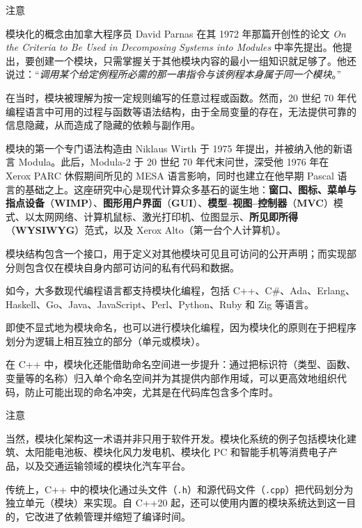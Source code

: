\begin{myNotic}{注意}

模块化的概念由加拿大程序员 David Parnas 在其 1972 年那篇开创性的论文 \emph{On the Criteria to Be Used in Decomposing Systems into Modules} 中率先提出。他提出，要创建一个模块，只需掌握关于其他模块内容的最小一组知识就足够了。他还说过：“\emph{调用某个给定例程所必需的那一串指令与该例程本身属于同一个模块}。”

在当时，模块被理解为按一定规则编写的任意过程或函数。然而，20 世纪 70 年代编程语言中可用的过程与函数等语法结构，由于全局变量的存在，无法提供可靠的信息隐藏，从而造成了隐藏的依赖与副作用。

模块的第一个专门语法构造由 Niklaus Wirth 于 1975 年提出，并被纳入他的新语言 Modula。此后，Modula-2 于 20 世纪 70 年代末问世，深受他 1976 年在 Xerox PARC 休假期间所见的 MESA 语言影响，同时也建立在他早期 Pascal 语言的基础之上。这座研究中心是现代计算众多基石的诞生地：\textbf{窗口、图标、菜单与指点设备}（\textbf{WIMP}）、\textbf{图形用户界面}（\textbf{GUI}）、\textbf{模型–视图–控制器}（\textbf{MVC}）模式、以太网网络、计算机鼠标、激光打印机、位图显示、\textbf{所见即所得}（\textbf{WYSIWYG}）范式，以及 Xerox Alto（第一台个人计算机）。

模块结构包含一个接口，用于定义对其他模块可见且可访问的公开声明；而实现部分则包含仅在模块自身内部可访问的私有代码和数据。

如今，大多数现代编程语言都支持模块化编程，包括 C++、C\#、Ada、Erlang、Haskell、Go、Java、JavaScript、Perl、Python、Ruby 和 Zig 等语言。

即使不显式地为模块命名，也可以进行模块化编程，因为模块化的原则在于把程序划分为逻辑上相互独立的部分（单元或模块）。

在 C++ 中，模块化还能借助命名空间进一步提升：通过把标识符（类型、函数、变量等的名称）归入单个命名空间并为其提供内部作用域，可以更高效地组织代码，防止可能出现的命名冲突，尤其是在代码库包含多个库时。
\end{myNotic}

\begin{myNotic}{注意}

当然，模块化架构这一术语并非只用于软件开发。模块化系统的例子包括模块化建筑、太阳能电池板、模块化风力发电机、模块化 PC 和智能手机等消费电子产品，以及交通运输领域的模块化汽车平台。
\end{myNotic}

传统上，C++ 中的模块化通过头文件（\texttt{.h}）和源代码文件（\texttt{.cpp}）把代码划分为独立单元（模块）来实现。自 C++20 起，还可以使用内置的模块系统达到这一目的，它改进了依赖管理并缩短了编译时间。

